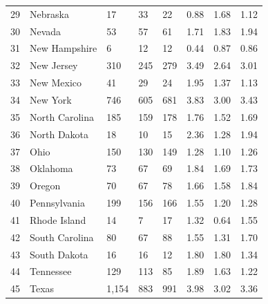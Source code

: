 \documentclass[
  letterpaper,
  DIV=11,
  numbers=noendperiod]{scrreprt}
\begin{document}
\begin{tabular}{lllllrrr}
29 &              Nebraska &              17 &         33 &         22 &          0.88 &        1.68 &        1.12 \\
30 &                Nevada &              53 &         57 &         61 &          1.71 &        1.83 &        1.94 \\
31 &         New Hampshire &               6 &         12 &         12 &          0.44 &        0.87 &        0.86 \\
32 &            New Jersey &             310 &        245 &        279 &          3.49 &        2.64 &        3.01 \\
33 &            New Mexico &              41 &         29 &         24 &          1.95 &        1.37 &        1.13 \\
34 &              New York &             746 &        605 &        681 &          3.83 &        3.00 &        3.43 \\
35 &        North Carolina &             185 &        159 &        178 &          1.76 &        1.52 &        1.69 \\
36 &          North Dakota &              18 &         10 &         15 &          2.36 &        1.28 &        1.94 \\
37 &                  Ohio &             150 &        130 &        149 &          1.28 &        1.10 &        1.26 \\
38 &              Oklahoma &              73 &         67 &         69 &          1.84 &        1.69 &        1.73 \\
39 &                Oregon &              70 &         67 &         78 &          1.66 &        1.58 &        1.84 \\
40 &          Pennsylvania &             199 &        156 &        166 &          1.55 &        1.20 &        1.28 \\
41 &          Rhode Island &              14 &          7 &         17 &          1.32 &        0.64 &        1.55 \\
42 &        South Carolina &              80 &         67 &         88 &          1.55 &        1.31 &        1.70 \\
43 &          South Dakota &              16 &         16 &         12 &          1.80 &        1.80 &        1.34 \\
44 &             Tennessee &             129 &        113 &         85 &          1.89 &        1.63 &        1.22 \\
45 &                 Texas &           1,154 &        883 &        991 &          3.98 &        3.02 &        3.36 \\

\end{tabular}
\end{document}

